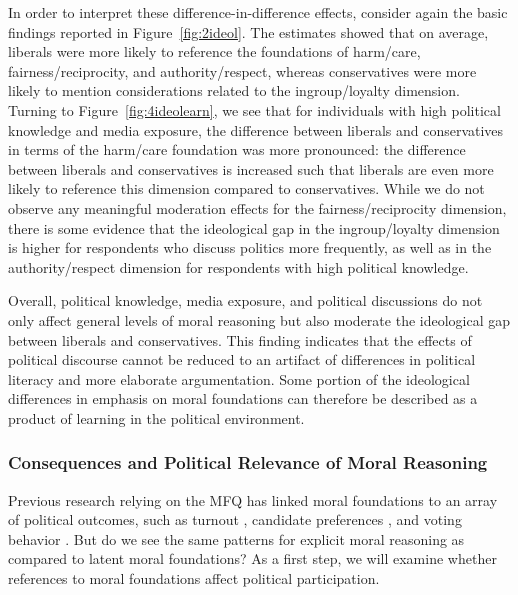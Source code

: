 \documentclass[12pt]{article}
\begin{document}
In order to interpret these difference-in-difference effects, consider again the basic findings reported in Figure~\ref{fig:2ideol}. The estimates showed that on average, liberals were more likely to reference the foundations of harm/care, fairness/reciprocity, and authority/respect, whereas conservatives were more likely to mention considerations related to the ingroup/loyalty dimension. Turning to Figure~\ref{fig:4ideolearn}, we see that for individuals with high political knowledge and media exposure, the difference between liberals and conservatives in terms of the harm/care foundation was more pronounced: the difference between liberals and conservatives is increased such that liberals are even more likely to reference this dimension compared to conservatives. While we do not observe any meaningful moderation effects for the fairness/reciprocity dimension, there is some evidence that the ideological gap in the ingroup/loyalty dimension is higher for respondents who discuss politics more frequently, as well as in the authority/respect dimension for respondents with high political knowledge.

Overall, political knowledge, media exposure, and political discussions do not only affect general levels of moral reasoning but also moderate the ideological gap between liberals and conservatives. This finding indicates that the effects of political discourse cannot be reduced to an artifact of differences in political literacy and more elaborate argumentation. Some portion of the ideological differences in emphasis on moral foundations can therefore be described as a product of learning in the political environment.
\clearpage


\subsubsection{Consequences and Political Relevance of Moral Reasoning}

Previous research relying on the MFQ has linked moral foundations to an array of political outcomes, such as turnout \citep{johnson2014ideology}, candidate preferences \citep{iyer2010beyond}, and voting behavior \citep{franks2015using}. But do we see the same patterns for explicit moral reasoning as compared to latent moral foundations? As a first step, we will examine whether references to moral foundations affect political participation.
\end{document}
